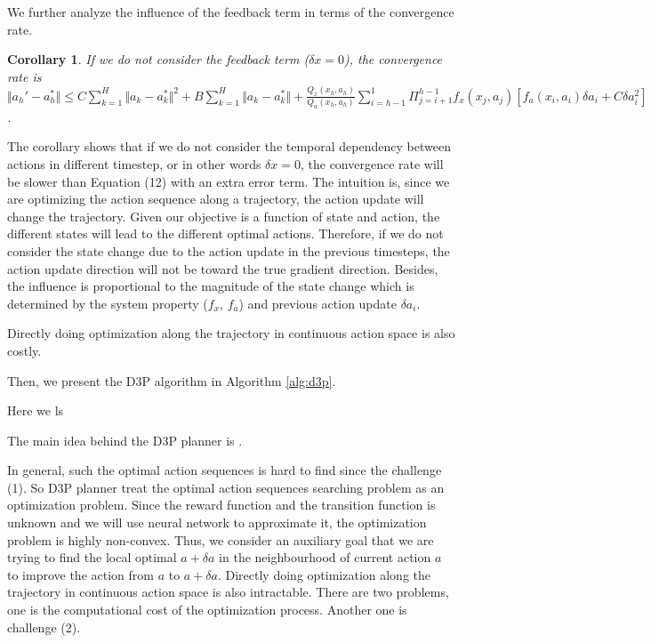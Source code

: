 \documentclass{article} %
\newtheorem{corollary}{Corollary}
\newcommand{\yue}[1]{ {#1}}
\begin{document}
  We further analyze the influence of the feedback term in terms of the convergence rate.  
 \begin{corollary}\label{coro:feedback}
\yue{If we do not consider the feedback term ($\delta x = 0$)},  the convergence rate is {\small $\Vert a_h' - a_h^* \Vert  \le C \sum_{k=1}^H\Vert a_k  -a_k^* \Vert^2  + B \sum_{k=1}^H\Vert a_k  -a_k^* \Vert  + \frac{Q_x(x_h, a_h)}{Q_a(x_h, a_h)}\sum_{i=h-1}^1 \Pi_{j=i+1}^{h-1}f_x(x_j, a_j)\left[ f_a(x_i, a_i)\delta a_i  +C   \delta a_i  ^2 \right] $}.
\end{corollary}

\yue{The corollary shows that if we do not consider the temporal dependency between actions in different timestep, or in other words $\delta x=0$, the convergence rate will be slower than Equation (12) with an extra error term. }
 The intuition is, since we are optimizing the action sequence along a trajectory,  the action update will change the trajectory. Given our objective is  a function of state and action,  the different states will lead to the different optimal actions. Therefore, if we do not consider the state change due to the action update in the previous timesteps, the action update direction will not be toward  the true gradient direction. Besides, the influence is proportional to the magnitude of the state change which is determined by the system property ($f_x$, $f_a$) and previous action update $\delta a_i $. 
 
\iffalse


Directly doing optimization along the trajectory in continuous action space is also costly. 



Then, we present the D3P algorithm in Algorithm \ref{alg:d3p}.

Here we ls




The main idea behind the D3P planner is . 







In general, such the optimal action sequences is hard to find since the  challenge (1). So D3P planner treat the optimal action sequences searching problem as an optimization problem. Since the reward function and the transition function is unknown and we will use neural network to approximate it, the optimization problem is highly non-convex. Thus, we consider an auxiliary goal that we are trying to find the local optimal $a + \delta a$ in the neighbourhood of current action $a$ to improve the action from $a$ to $a+\delta a$. Directly doing optimization along the trajectory in continuous action space is also intractable. There are two problems, one is the computational cost of the optimization process. Another one is challenge (2). 
\end{document}
